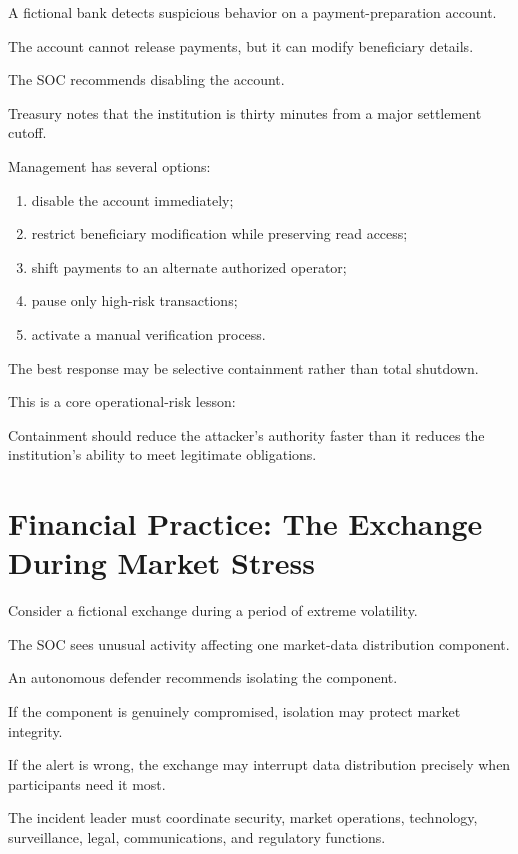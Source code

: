 A fictional bank detects suspicious behavior on a payment-preparation account.

The account cannot release payments, but it can modify beneficiary details.

The SOC recommends disabling the account.

Treasury notes that the institution is thirty minutes from a major settlement cutoff.

Management has several options:

\begin{enumerate}
    \item disable the account immediately;
    \item restrict beneficiary modification while preserving read access;
    \item shift payments to an alternate authorized operator;
    \item pause only high-risk transactions;
    \item activate a manual verification process.
\end{enumerate}

The best response may be selective containment rather than total shutdown.

This is a core operational-risk lesson:

\begin{intuition}
Containment should reduce the attacker's authority faster than it reduces the institution's ability to meet legitimate obligations.
\end{intuition}

\section{Financial Practice: The Exchange During Market Stress}

Consider a fictional exchange during a period of extreme volatility.

The SOC sees unusual activity affecting one market-data distribution component.

An autonomous defender recommends isolating the component.

If the component is genuinely compromised, isolation may protect market integrity.

If the alert is wrong, the exchange may interrupt data distribution precisely when participants need it most.

The incident leader must coordinate security, market operations, technology, surveillance, legal, communications, and regulatory functions.

